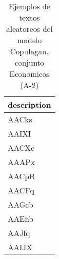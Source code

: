 \begin{table}[H]
\centering
\fontsize{8}{14}\selectfont
\caption{Ejemplos de textos aleatoreos del modelo Copulagan, conjunto Economicos (A-2)}
\label{table-sample10-economicos-a-2-copulagan-text}
\begin{tabular}{|m{50em}|}
\hline
\rowcolor[gray]{0.8}
description \\
\hline AACks \\
\hline AAIXI \\
\hline AACXc \\
\hline AAAPx \\
\hline AACpB \\
\hline AACFq \\
\hline AAGcb \\
\hline AAEnb \\
\hline AAJfq \\
\hline AAIJX \\
\hline
\end{tabular}
\end{table}
